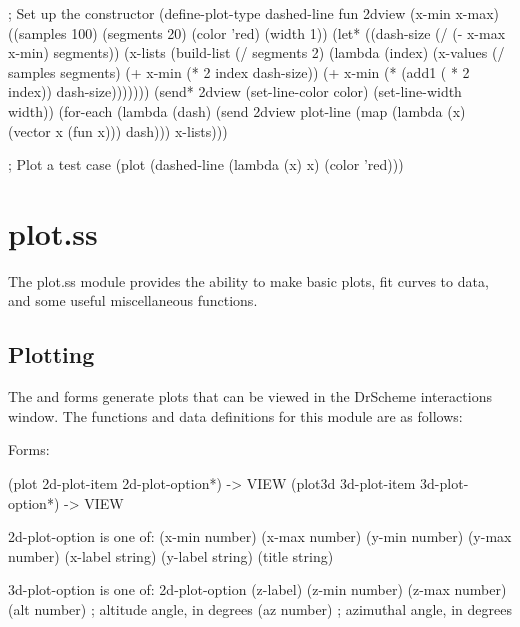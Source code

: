 \documentclass{article}
\begin{document}
{\begin{schemedisplay}
; Set up the constructor
(define-plot-type dashed-line
  fun 2dview (x-min x-max) ((samples 100) (segments 20) (color 'red) (width 1))
  (let* ((dash-size (/ (- x-max x-min) segments))
         (x-lists (build-list 
                   (/ segments 2) 
                   (lambda (index)                                    
                     (x-values 
                      (/ samples segments) 
                      (+ x-min (* 2 index dash-size))
                      (+ x-min (* (add1 ( * 2 index)) dash-size)))))))
    (send* 2dview 
           (set-line-color color)
           (set-line-width width))
    (for-each 
     (lambda (dash)
       (send 2dview plot-line 
              (map (lambda (x) (vector x (fun x))) dash))) 
     x-lists)))

; Plot a test case
(plot (dashed-line (lambda (x) x) (color 'red)))
\end{schemedisplay}

\pagebreak

\section{plot.ss}

The plot.ss module provides the ability to make basic plots, fit curves to data, and some useful miscellaneous functions.

\subsection{Plotting}


The  and  forms generate plots that can be viewed in the DrScheme interactions window. The functions and data definitions for this  module are as follows:



\begin{schemedisplay}

       
Forms:
       
 (plot 2d-plot-item 2d-plot-option*) -> VIEW
 (plot3d 3d-plot-item 3d-plot-option*) -> VIEW
     
2d-plot-option is one of:
 (x-min number)
 (x-max number)
 (y-min number)
 (y-max number)
 (x-label string)
 (y-label string)
 (title string)
     
3d-plot-option is one of:
 2d-plot-option
 (z-label)
 (z-min number)
 (z-max number)
 (alt number)    ; altitude angle, in degrees
 (az number)     ; azimuthal angle, in degrees
     

\end{schemedisplay}}
\end{document}
